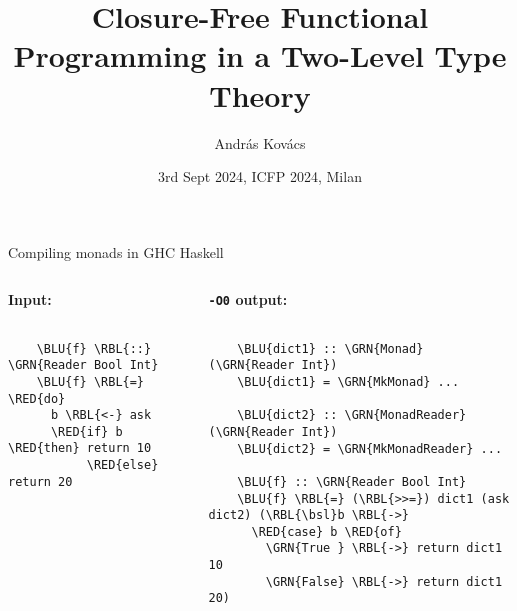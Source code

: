 \documentclass[dvipsnames,aspectratio=169]{beamer}
\title{Closure-Free Functional Programming in a Two-Level Type Theory}
\author{András Kovács}
\institute{University of Gothenburg}
\date{3rd Sept 2024, ICFP 2024, Milan}
\theoremstyle{remark}
\newcommand{\RED}[1]{{\color{BrickRed} #1}}
\newcommand{\GRN}[1]{{\color{OliveGreen} #1}}
\newcommand{\RBL}[1]{{\color{RoyalBlue} #1}}
\newcommand{\BLU}[1]{{\color{Blue} #1}}
\newcommand{\bsl}{\textbackslash}
\begin{document}
\frame{\titlepage}

\begin{frame}[fragile]{Compiling monads in GHC Haskell}

\begin{columns}
\begin{column}{0.3\textwidth}
\textbf{Input:}
\begin{Verbatim}[commandchars=\\\{\}]

    \BLU{f} \RBL{::} \GRN{Reader Bool Int}
    \BLU{f} \RBL{=} \RED{do}
      b \RBL{<-} ask
      \RED{if} b \RED{then} return 10
           \RED{else} return 20






\end{Verbatim}
\end{column}
\pause
\begin{column}{0.5\textwidth}
\textbf{\texttt{-O0} output:}
\begin{Verbatim}[commandchars=\\\{\}]

    \BLU{dict1} :: \GRN{Monad} (\GRN{Reader Int})
    \BLU{dict1} = \GRN{MkMonad} ...

    \BLU{dict2} :: \GRN{MonadReader} (\GRN{Reader Int})
    \BLU{dict2} = \GRN{MkMonadReader} ...

    \BLU{f} :: \GRN{Reader Bool Int}
    \BLU{f} \RBL{=} (\RBL{>>=}) dict1 (ask dict2) (\RBL{\bsl}b \RBL{->}
      \RED{case} b \RED{of}
        \GRN{True } \RBL{->} return dict1 10
        \GRN{False} \RBL{->} return dict1 20)
\end{Verbatim}
\end{column}
\end{columns}

\end{frame}

\end{document}
